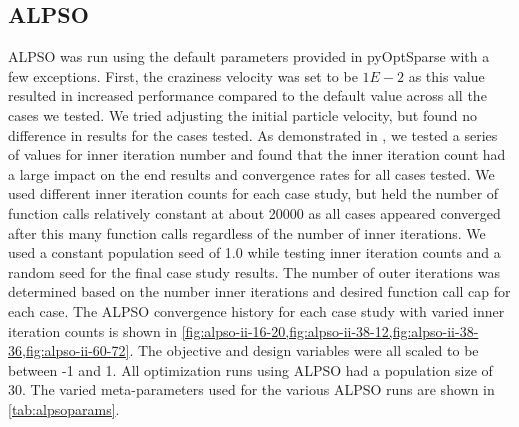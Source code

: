 \documentclass{jpconf}
\begin{document}
\subsection{ALPSO} 
ALPSO was run using the default parameters provided in pyOptSparse \cite{wu2020} with a few exceptions. First, the craziness velocity was set to be $1E-2$ as this value resulted in increased performance compared to the default value across all the cases we tested. We tried adjusting the initial particle velocity, but found no difference in results for the cases tested. As demonstrated in \cite{jansen2011_alpso}, we tested a series of values for inner iteration number and found that the inner iteration count had a large impact on the end results and convergence rates for all cases tested. We used different inner iteration counts for each case study, but held the number of function calls relatively constant at about 20000 as all cases appeared converged after this many function calls regardless of the number of inner iterations. We used a constant population seed of 1.0 while testing inner iteration counts and a random seed for the final case study results. The number of outer iterations was determined based on the number inner iterations and desired function call cap for each case. The ALPSO convergence history for each case study with varied inner iteration counts is shown in \cref{fig:alpso-ii-16-20,fig:alpso-ii-38-12,fig:alpso-ii-38-36,fig:alpso-ii-60-72}. The objective and design variables were all scaled to be between -1 and 1.  All optimization runs using ALPSO had a population size of 30. The varied meta-parameters used for the various ALPSO runs are shown in \cref{tab:alpsoparams}.
\end{document}
